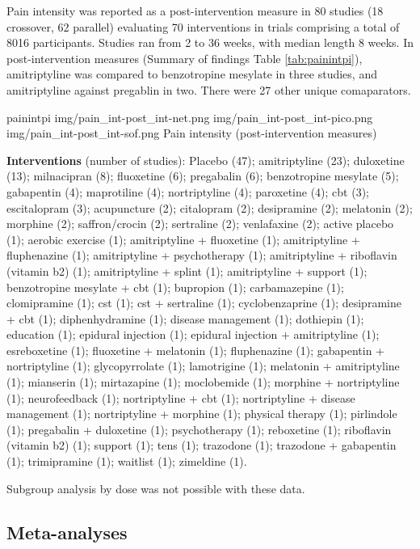 \documentclass{report}\usepackage[]{graphicx}\usepackage[]{color}
\begin{document}
Pain intensity was reported as a post-intervention measure in 80 studies (18 crossover, 62 parallel) evaluating 70 interventions in trials comprising a total of 8016 participants. Studies ran from 2 to 36 weeks, with median length 8 weeks. In post-intervention measures (Summary of findings Table \ref{tab:painintpi}), amitriptyline was compared to benzotropine mesylate in three studies, and amitriptyline against pregablin in two. There were 27 other unique comaparators.

\soffignew
{painintpi}
{img/pain_int-post_int-net.png}
{img/pain_int-post_int-pico.png}
{img/pain_int-post_int-sof.png}
{Pain intensity (post-intervention measures)}

\textbf{Interventions} (number of studies): Placebo (47); amitriptyline (23); duloxetine (13); milnacipran (8); fluoxetine (6); pregabalin (6); benzotropine mesylate (5); gabapentin (4); maprotiline (4); nortriptyline (4); paroxetine (4); cbt (3); escitalopram (3); acupuncture (2); citalopram (2); desipramine (2); melatonin (2); morphine (2); saffron/crocin (2); sertraline (2); venlafaxine (2); active placebo (1); aerobic exercise (1); amitriptyline + fluoxetine (1); amitriptyline + fluphenazine (1); amitriptyline + psychotherapy (1); amitriptyline + riboflavin (vitamin b2) (1); amitriptyline + splint (1); amitriptyline + support (1); benzotropine mesylate + cbt (1); bupropion (1); carbamazepine (1); clomipramine (1); cst (1); cst + sertraline (1); cyclobenzaprine (1); desipramine + cbt (1); diphenhydramine (1); disease management (1); dothiepin (1); education (1); epidural injection (1); epidural injection + amitriptyline (1); esreboxetine (1); fluoxetine + melatonin (1); fluphenazine (1); gabapentin + nortriptyline (1); glycopyrrolate (1); lamotrigine (1); melatonin + amitriptyline (1); mianserin (1); mirtazapine (1); moclobemide (1); morphine + nortriptyline (1); neurofeedback (1); nortriptyline + cbt (1); nortriptyline + disease management (1); nortriptyline + morphine (1); physical therapy (1); pirlindole (1); pregabalin + duloxetine (1); psychotherapy (1); reboxetine (1); riboflavin (vitamin b2) (1); support (1); tens (1); trazodone (1); trazodone + gabapentin (1); trimipramine (1); waitlist (1); zimeldine (1).

Subgroup analysis by dose was not possible with these data.


\subsection{Meta-analyses}
\end{document}
